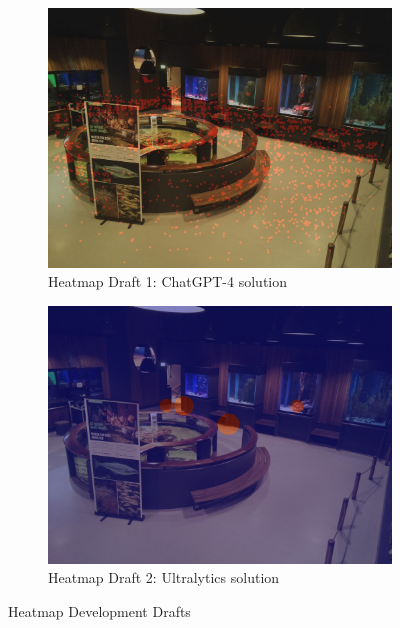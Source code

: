 \begin{figure}[H]
    \centering
    \begin{subfigure}{0.45\textwidth}
        \centering
        \includegraphics[width=\textwidth]{Images/Analytics/heatmap_gpt.jpg}
        \caption{Heatmap Draft 1: ChatGPT-4 solution}
    \end{subfigure}
    \hfill
    \begin{subfigure}{0.45\textwidth}
        \centering
        \includegraphics[width=1\textwidth]{Images/Analytics/heatmap_ultralytics.jpg}
        \caption{Heatmap Draft 2: Ultralytics solution}
    \end{subfigure}
    \caption{Heatmap Development Drafts}
    \label{fig:heatmap_drafts}
\end{figure}

